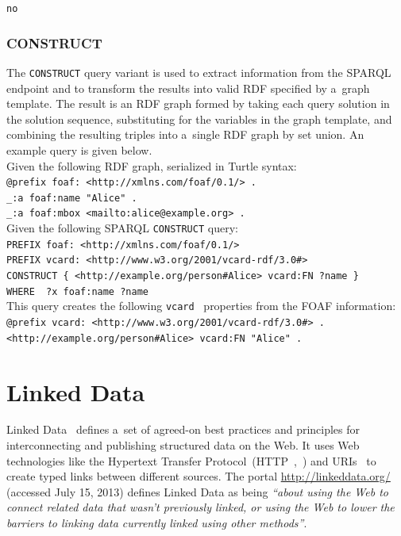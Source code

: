 \texttt{no}

\subsubsection{CONSTRUCT}

The \texttt{CONSTRUCT} query variant is used to extract
information from the SPARQL endpoint
and to transform the results into valid RDF
specified by a~graph template.
The result is an RDF graph formed by taking
each query solution in the solution sequence,
substituting for the variables in the graph template,
and combining the resulting triples into
a~single RDF graph by set union.
An example query is given below.\\

\noindent Given the following RDF graph,
serialized in Turtle syntax:\\

\texttt{@prefix foaf: <http://xmlns.com/foaf/0.1/> .}\\
\texttt{\indent \_:a foaf:name "Alice" .}\\
\texttt{\indent \_:a foaf:mbox <mailto:alice@example.org> .}\\

\noindent Given the following SPARQL \texttt{CONSTRUCT} query:\\

\texttt{PREFIX foaf: <http://xmlns.com/foaf/0.1/>}\\
\texttt{\indent PREFIX vcard: <http://www.w3.org/2001/vcard-rdf/3.0\#>}\\
\texttt{\indent CONSTRUCT \{ <http://example.org/person\#Alice> vcard:FN ?name \}}\\
\texttt{\indent WHERE { ?x foaf:name ?name }}\\

\noindent This query creates the following
\texttt{vcard}~\cite{dawson1998vcard}
properties from the FOAF information:\\

\texttt{@prefix vcard: <http://www.w3.org/2001/vcard-rdf/3.0\#> .}\\
\texttt{\indent <http://example.org/person\#Alice> vcard:FN "Alice" .}

\section{Linked Data}

Linked Data~\cite{bernerslee2006linkeddata}
defines a~set of agreed-on best practices and
principles for interconnecting and publishing
structured data on the Web.
It uses Web technologies like the Hypertext Transfer Protocol~(HTTP~,~\cite{fielding1999http})
and URIs~\cite{bernerslee2005uri}
to create typed links between different sources.
The portal \url{http://linkeddata.org/} (accessed July 15, 2013)
defines Linked Data as being
\textit{``about using the Web to connect related data that
wasn’t previously linked, or using the Web
to lower the barriers to linking data
currently linked using other methods''}.

